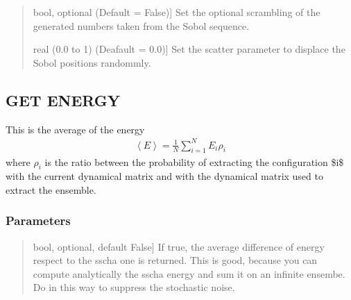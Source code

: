 \documentclass[a4paper,11pt,english]{sphinxmanual}
\begin{document}
\begin{fulllineitems}
\begin{fulllineitems}
\begin{quote}
\begin{description}
\sphinxlineitem{sobol\_scramble}{[}bool, optional (Default = False){]}
\sphinxAtStartPar
Set the optional scrambling of the generated numbers taken from the Sobol sequence.

\sphinxlineitem{sobol\_scatter}{[}real (0.0 to 1) (Deafault = 0.0){]}
\sphinxAtStartPar
Set the scatter parameter to displace the Sobol positions randommly.

\end{description}
\end{quote}

\end{fulllineitems}


\begin{fulllineitems}
\label{\detokenize{apireference:sscha.Ensemble.Ensemble.get_average_energy}}
\pysigstartsignatures
{}
\pysigstopsignatures

\subsection{GET ENERGY}
\label{\detokenize{apireference:get-energy}}
\sphinxAtStartPar
This is the average of the energy
\begin{equation*}
\begin{split}\left< E\right> = \frac{1}{N} \sum_{i = 1}^{N} E_i \rho_i\end{split}
\end{equation*}
\sphinxAtStartPar
where \(\rho_i\) is the ratio between the probability of extracting the configuration \$i\$
with the current dynamical matrix and with the dynamical matrix used to extract the ensemble.


\subsubsection{Parameters}
\label{\detokenize{apireference:id2}}\begin{quote}
\begin{description}
\sphinxlineitem{subtract\_sscha}{[}bool, optional, default False{]}
\sphinxAtStartPar
If true, the average difference of energy respect to the sscha one is returned. This
is good, because you can compute analytically the sscha energy and sum it on an infinite
ensembe. Do in this way to suppress the stochastic noise.


\end{description}
\end{quote}
\end{fulllineitems}
\end{fulllineitems}
\end{document}
